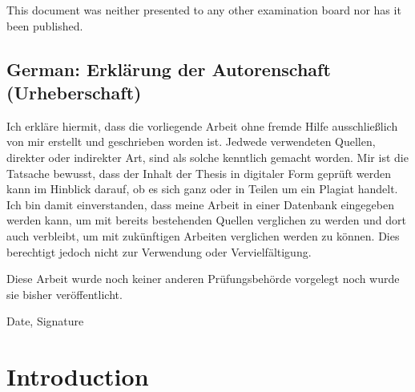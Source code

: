 \documentclass[a4paper,11pt,oneside]{article}
\begin{document}
  This document was neither presented to any other examination board
  nor has it been published.

  \subsection*{German: Erklärung der Autorenschaft (Urheberschaft)}
 
  Ich erkläre hiermit, dass die vorliegende Arbeit ohne fremde Hilfe
  ausschließlich von mir erstellt und geschrieben worden ist. Jedwede
  verwendeten Quellen, direkter oder indirekter Art, sind als solche
  kenntlich gemacht worden. Mir ist die Tatsache bewusst, dass der
  Inhalt der Thesis in digitaler Form geprüft werden kann im Hinblick
  darauf, ob es sich ganz oder in Teilen um ein Plagiat handelt. Ich
  bin damit einverstanden, dass meine Arbeit in einer Datenbank
  eingegeben werden kann, um mit bereits bestehenden Quellen
  verglichen zu werden und dort auch verbleibt, um mit zukünftigen
  Arbeiten verglichen werden zu können. Dies berechtigt jedoch nicht
  zur Verwendung oder Vervielfältigung.

  Diese Arbeit wurde noch keiner anderen Prüfungsbehörde vorgelegt
  noch wurde sie bisher veröffentlicht.

  \vspace{20mm}

  Date, Signature

  \newpage
  \tableofcontents

  \clearpage

  \section{Introduction}


  
\end{document}

